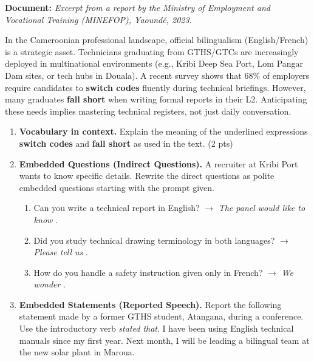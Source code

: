 \documentclass[11pt]{article}
\begin{document}
\begin{exercice}
\textbf{Document:} \textit{Excerpt from a report by the Ministry of Employment and Vocational Training (MINEFOP), Yaoundé, 2023.}

\og In the Cameroonian professional landscape, official bilingualism (English/French) is a strategic asset. Technicians graduating from GTHS/GTCs are increasingly deployed in multinational environments (e.g., Kribi Deep Sea Port, Lom Pangar Dam sites, or tech hubs in Douala). A recent survey shows that 68\% of employers require candidates to \textbf{switch codes} fluently during technical briefings. However, many graduates \textbf{fall short} when writing formal reports in their L2. Anticipating these needs implies mastering technical registers, not just daily conversation. \fg

\begin{enumerate}
    \item \textbf{Vocabulary in context.} Explain the meaning of the underlined expressions \og \textbf{switch codes} \fg and \og \textbf{fall short} \fg as used in the text. (2 pts)
    \item \textbf{Embedded Questions (Indirect Questions).} A recruiter at Kribi Port wants to know specific details. Rewrite the direct questions as polite embedded questions starting with the prompt given.
    \begin{enumerate}
        \item \og Can you write a technical report in English? \fg $\rightarrow$ \textit{The panel would like to know} \underline{\hspace{4cm}}.
        \item \og Did you study technical drawing terminology in both languages? \fg $\rightarrow$ \textit{Please tell us} \underline{\hspace{4cm}}.
        \item \og How do you handle a safety instruction given only in French? \fg $\rightarrow$ \textit{We wonder} \underline{\hspace{4cm}}.
    \end{enumerate}
    \item \textbf{Embedded Statements (Reported Speech).} Report the following statement made by a former GTHS student, Atangana, during a conference. Use the introductory verb \textit{stated that}.
    \og I have been using English technical manuals since my first year. Next month, I will be leading a bilingual team at the new solar plant in Maroua. \fg
\end{enumerate}
\end{exercice}
\end{document}
